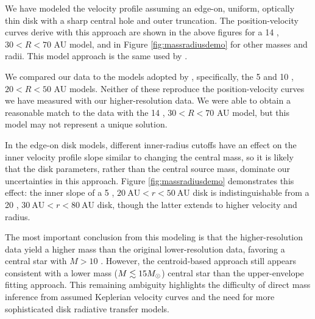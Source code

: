 \documentclass[twocolumn]{aastex61}
\begin{document}


We have modeled the velocity profile assuming an edge-on, uniform, optically
thin disk with a sharp central hole and outer truncation.  The
position-velocity curves derive with this approach are shown in the above
figures for a 14 \msun, $30 < R < 70$ AU model, and in Figure \ref{fig:massradiusdemo}
for other masses and radii.  This model approach is the same used by
\citet{Plambeck2016a}.

We compared our data to the models adopted by \citet{Plambeck2016a},
specifically, the 5 and 10 \msun, $20 < R < 50$ AU models.  Neither of these
reproduce the position-velocity curves we have measured with our
higher-resolution data.  We were able to obtain a reasonable match
to the data with the 14 \msun, $30 < R < 70$ AU  model, but this model
may not represent a unique solution.


In the edge-on disk models, different inner-radius cutoffs have an effect on
the inner velocity profile slope similar to changing the central mass, so it is
likely that the disk parameters, rather than the central source mass, dominate
our uncertainties in this approach.  
Figure \ref{fig:massradiusdemo} demonstrates this effect: the inner slope of
a 5 \msun, $20~\mathrm{AU} < r < 50~\mathrm{AU}$ disk is indistinguishable
from a 20 \msun , $30~\mathrm{AU} < r < 80~\mathrm{AU}$ disk, though the latter
extends to higher velocity and radius.

The most important conclusion from this modeling is that the higher-resolution
data yield a higher mass than the original lower-resolution data, favoring
a central star with $M>10$ \msun.  However, the centroid-based approach
still appears consistent with a lower mass ($M\lesssim15M_{\odot}$) central star
than the \citet{Seifried2016a} upper-envelope fitting approach.  This remaining
ambiguity highlights the difficulty of direct mass inference from assumed
Keplerian velocity curves and the need for more sophisticated disk radiative
transfer models.
\end{document}
